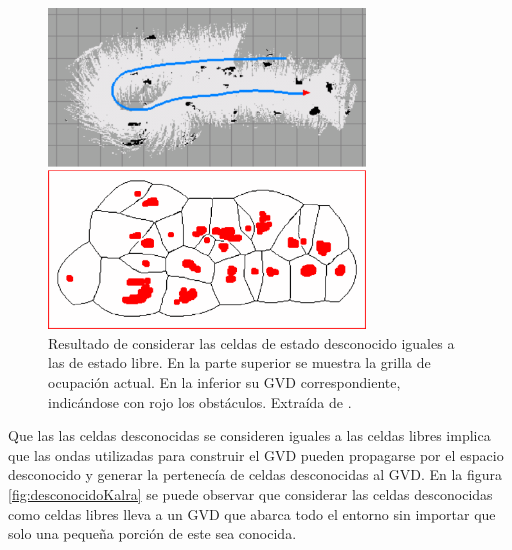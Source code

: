 \begin{figure}[H]
  \centerfloat

  \includegraphics[clip=true, width=0.75\textwidth]{imagenes/desconocidoCons/kalraOG.png}

  \caption[Resultado de considerar las celdas de estado desconocido iguales a las de estado libre.]{Resultado de considerar las celdas de estado desconocido iguales a las de estado libre. En la parte superior se muestra la grilla de ocupación actual. En la inferior su GVD correspondiente, indicándose con rojo los obstáculos. Extraída de \cite{kalra2009incremental}.}\label{fig:kalraOG}

\end{figure}

Que las las celdas desconocidas se consideren iguales a las celdas libres
implica que las ondas utilizadas para construir el GVD pueden propagarse por el
espacio desconocido y generar la pertenecía de celdas desconocidas al GVD.
En la figura \ref{fig:desconocidoKalra} se puede observar que considerar las
celdas desconocidas como celdas libres lleva a un GVD que abarca
todo el entorno sin importar que solo una pequeña porción de este sea
conocida. 

